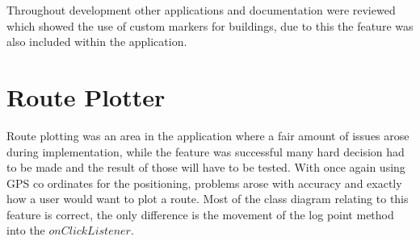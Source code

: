 Throughout development other applications and documentation were reviewed which showed the use of custom markers for buildings, due to this the feature was also included within the application.

\section{Route Plotter}
Route plotting was an area in the application where a fair amount of issues arose during implementation, while the feature was successful many hard decision had to be made and the result of those will have to be tested. With once again using GPS co ordinates for the positioning, problems arose with accuracy and exactly how a user would want to plot a route. Most of the class diagram relating to this feature is correct, the only difference is the movement of the log point method into the $onClickListener$.
